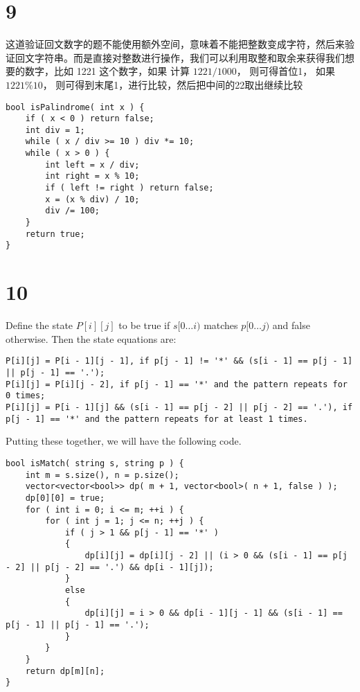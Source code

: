\documentclass[12pt,a4paper]{article}
\begin{document}
\section{9}
\begin{CJK}{UTF8}{gbsn}
这道验证回文数字的题不能使用额外空间，意味着不能把整数变成字符，然后来验证回文字符串。而是直接对整数进行操作，我们可以利用取整和取余来获得我们想要的数字，比如 1221 这个数字，如果 计算 $1221 / 1000$， 则可得首位1， 如果 $1221 \% 10$， 则可得到末尾1，进行比较，然后把中间的22取出继续比较
\end{CJK}
\begin{lstlisting}
bool isPalindrome( int x ) {
	if ( x < 0 ) return false;
	int div = 1;
	while ( x / div >= 10 ) div *= 10;
	while ( x > 0 ) {
		int left = x / div;
		int right = x % 10;
		if ( left != right ) return false;
		x = (x % div) / 10;
		div /= 100;
	}
	return true;
}
\end{lstlisting}

\section{10}
Define the state $P[i][j]$ to be true if $s[0\dots i)$ matches $p[0\dots j)$ and false otherwise. Then the state equations are:
\begin{lstlisting}
P[i][j] = P[i - 1][j - 1], if p[j - 1] != '*' && (s[i - 1] == p[j - 1] || p[j - 1] == '.');
P[i][j] = P[i][j - 2], if p[j - 1] == '*' and the pattern repeats for 0 times;
P[i][j] = P[i - 1][j] && (s[i - 1] == p[j - 2] || p[j - 2] == '.'), if p[j - 1] == '*' and the pattern repeats for at least 1 times.
\end{lstlisting}
Putting these together, we will have the following code.
\begin{lstlisting}
bool isMatch( string s, string p ) {
	int m = s.size(), n = p.size();
	vector<vector<bool>> dp( m + 1, vector<bool>( n + 1, false ) );
	dp[0][0] = true;
	for ( int i = 0; i <= m; ++i ) {
		for ( int j = 1; j <= n; ++j ) {
			if ( j > 1 && p[j - 1] == '*' ) 
			{
				dp[i][j] = dp[i][j - 2] || (i > 0 && (s[i - 1] == p[j - 2] || p[j - 2] == '.') && dp[i - 1][j]);
			}
			else 
			{
				dp[i][j] = i > 0 && dp[i - 1][j - 1] && (s[i - 1] == p[j - 1] || p[j - 1] == '.');
			}
		}
	}
	return dp[m][n];
}
\end{lstlisting}
\end{document}
